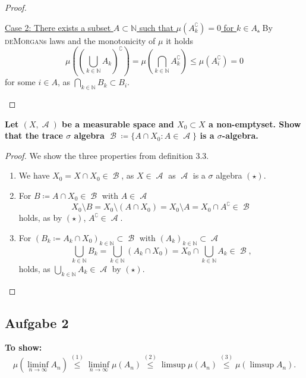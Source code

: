 \documentclass{article}
\DeclareMathOperator{\A}{\mathcal{A}}
\DeclareMathOperator{\B}{\mathcal{B}}
\renewcommand{\c}{\complement}
\newcommand{\N}{\mathbb{N}} %
\begin{document}
\begin{proof}
\begin{enumerate}[label = (\roman*)]
        \underline{Case 2: There exists a subset $A \subset \N$ such that $\mu(A_k^{\c}) = 0$ for $k \in A$.} 
        By \textsc{deMorgan}s laws and the monotonicity of $\mu$ it holds
        \begin{equation*}
            \mu\left(\left(\bigcup_{k \in \N} A_k\right)^{\c} \right)
            = \mu\left(\bigcap_{k \in \N} A_k^{\c} \right)
            \le \mu(A_i^{\c})
            = 0
        \end{equation*}
        for some $i \in A$, as $\bigcap_{k \in \N} B_k \subset B_i$.
    \end{enumerate}
\end{proof}

\textbf{
    Let $(X, \A)$ be a measurable space and $X_0 \subset X$ a non-emptyset.
    Show that the trace $\sigma$ algebra $\B \coloneqq \big\{A \cap X_0: A \in \A \big\}$ is a $\sigma$-algebra.
}

\begin{proof}
    We show the three properties from definition 3.3.
    \begin{enumerate}[label = (\roman*)]
        \item
        We have $X_0 = X \cap X_0 \in \B$, as $X \in \A$ as $\A$ is a $\sigma$ algebra $(\star)$.
        
        \item
        For $B \coloneqq A \cap X_0 \in \B$ with $A \in \A$
        \begin{equation*}
            X_0 \setminus B
            = X_0 \setminus (A \cap X_0)
            = X_0 \setminus A 
            = X_0 \cap A^{\c} \in \B
        \end{equation*}
        holds, as by $(\star)$, $A^{\c} \in \A$.
        
        \item
        For $(B_k \coloneqq A_k \cap X_0)_{k \in \N} \subset \B$ with $(A_k)_{k \in \N} \subset \A$
        \begin{equation*}
            \bigcup_{k \in \N} B_k
            = \bigcup_{k \in \N} (A_k \cap X_0)
            = X_0 \cap \bigcup_{k \in \N} A_k
            \in \B,
        \end{equation*}
        holds, as $\bigcup_{k \in \N} A_k \in \A$ by $(\star)$.
    \end{enumerate}
\end{proof}

\subsection*{Aufgabe 2}
\textbf{To show:
    $$
    \mu (\liminf_{n \to \infty} A_n) \overset{(1)}{\leq} \liminf_{n \to \infty} \mu(A_n) \overset{(2)}{\leq} \limsup \mu(A_n) \overset{(3)}{\leq} \mu(\limsup A_n).
$$ 
}
\end{document}
